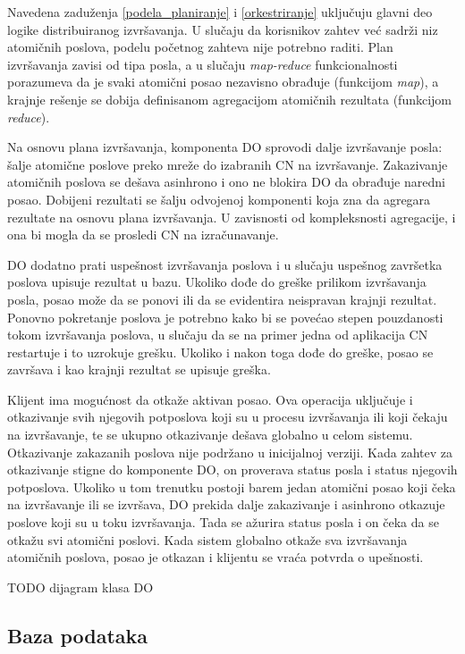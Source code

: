 \documentclass[12pt,oneside]{memoir}
\begin{document}
Navedena zaduženja \ref{podela_planiranje} i \ref{orkestriranje} uključuju glavni deo logike distribuiranog izvršavanja. U slučaju da korisnikov zahtev već sadrži niz atomičnih poslova, podelu početnog zahteva nije potrebno raditi. Plan izvršavanja zavisi od tipa posla, a u slučaju \emph{map-reduce} funkcionalnosti porazumeva da je svaki atomični posao nezavisno obrađuje (funkcijom \emph{map}), a krajnje rešenje se dobija definisanom agregacijom atomičnih rezultata (funkcijom \emph{reduce}). 

Na osnovu plana izvršavanja, komponenta DO sprovodi dalje izvršavanje posla: šalje atomične poslove preko mreže do izabranih CN na izvršavanje. Zakazivanje atomičnih poslova se dešava asinhrono i ono ne blokira DO da obrađuje naredni posao. Dobijeni rezultati se šalju odvojenoj komponenti koja zna da agregara rezultate na osnovu plana izvršavanja. U zavisnosti od kompleksnosti agregacije, i ona bi mogla da se prosledi CN na izračunavanje.

DO dodatno prati uspešnost izvršavanja poslova i u slučaju uspešnog završetka poslova upisuje rezultat u bazu. Ukoliko dođe do greške prilikom izvršavanja posla, posao može da se ponovi ili da se evidentira neispravan krajnji rezultat. Ponovno pokretanje poslova je potrebno kako bi se povećao stepen pouzdanosti tokom izvršavanja poslova, u slučaju da se na primer jedna od aplikacija CN restartuje i to uzrokuje grešku. Ukoliko i nakon toga dođe do greške, posao se završava i kao krajnji rezultat se upisuje greška.

Klijent ima mogućnost da otkaže aktivan posao. Ova operacija uključuje i otkazivanje svih njegovih potposlova koji su u procesu izvršavanja ili koji čekaju na izvršavanje, te se ukupno otkazivanje dešava globalno u celom sistemu. Otkazivanje zakazanih poslova nije podržano u inicijalnoj verziji.
Kada zahtev za otkazivanje stigne do komponente DO, on proverava status posla i status njegovih potposlova. Ukoliko u tom trenutku postoji barem jedan atomični posao koji čeka na izvršavanje ili se izvršava, DO prekida dalje zakazivanje i asinhrono otkazuje poslove koji su u toku izvršavanja. Tada se ažurira status posla i on čeka da se otkažu svi atomični poslovi. Kada sistem globalno otkaže sva izvršavanja atomičnih poslova, posao je otkazan i klijentu se vraća potvrda o upešnosti.

TODO dijagram klasa DO

\subsection{Baza podataka}
\end{document}
